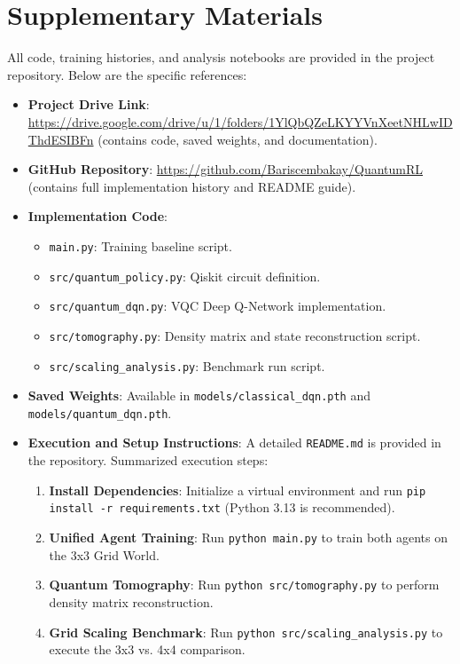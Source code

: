 \documentclass[12pt, a4paper]{article}
\begin{document}
\newpage


\section{Supplementary Materials}

\noindent All code, training histories, and analysis notebooks are provided in the project repository. Below are the specific references: 

\begin{itemize}[leftmargin=2em]
    \item \textbf{Project Drive Link}: 
    \newline \url{https://drive.google.com/drive/u/1/folders/1YlQbQZeLKYYVnXeetNHLwIDThdESIBFn} (contains code, saved weights, and documentation).
    \item \textbf{GitHub Repository}: \url{https://github.com/Bariscembakay/QuantumRL} (contains full implementation history and README guide).
    \item \textbf{Implementation Code}:
        \begin{itemize}
            \item \texttt{main.py}: Training baseline script.
            \item \texttt{src/quantum\_policy.py}: Qiskit circuit definition.
            \item \texttt{src/quantum\_dqn.py}: VQC Deep Q-Network implementation.
            \item \texttt{src/tomography.py}: Density matrix and state reconstruction script.
            \item \texttt{src/scaling\_analysis.py}: Benchmark run script.
        \end{itemize}
    \item \textbf{Saved Weights}: Available in \texttt{models/classical\_dqn.pth} and \texttt{models/quantum\_dqn.pth}.
    \item \textbf{Execution and Setup Instructions}: A detailed \texttt{README.md} is provided in the repository. Summarized execution steps:
        \begin{enumerate}[leftmargin=1.5em]
            \item \textbf{Install Dependencies}: Initialize a virtual environment and run \texttt{pip install -r requirements.txt} (Python 3.13 is recommended).
            \item \textbf{Unified Agent Training}: Run \texttt{python main.py} to train both agents on the 3x3 Grid World.
            \item \textbf{Quantum Tomography}: Run \texttt{python src/tomography.py} to perform density matrix reconstruction.
            \item \textbf{Grid Scaling Benchmark}: Run \texttt{python src/scaling\_analysis.py} to execute the 3x3 vs. 4x4 comparison.
        \end{enumerate}
\end{itemize}

\end{document}
